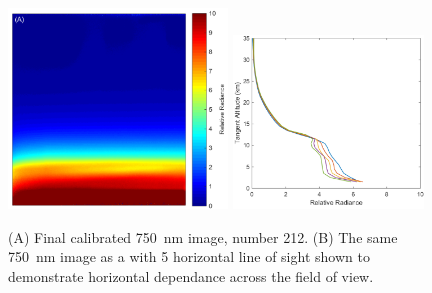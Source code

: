 \documentclass[12pt]{article}
\begin{document}
\newpage

\begin{figure}
    \begin{subfigure}[t]{0\textwidth}
        \label{fig:AfterImagesHorizontalDependance:a}
    \end{subfigure}
    \begin{subfigure}[t]{0\textwidth}
         \label{fig:AfterImagesHorizontalDependance:b}
    \end{subfigure}
    \includegraphics[width=0.52\textwidth]{./Images/5-2-AfterImage.pdf}
    \includegraphics[width=0.45\textwidth]{./Images/5-2-AliRadiancesHorizontal.pdf}
    \caption{(A) Final calibrated 750~nm image, number 212. (B) The same 750~nm image as a with 5 horizontal line of sight shown to demonstrate horizontal dependance across the field of view.}
    \label{fig:AfterImagesHorizontalDependance}
\end{figure}

\newpage
\end{document}
